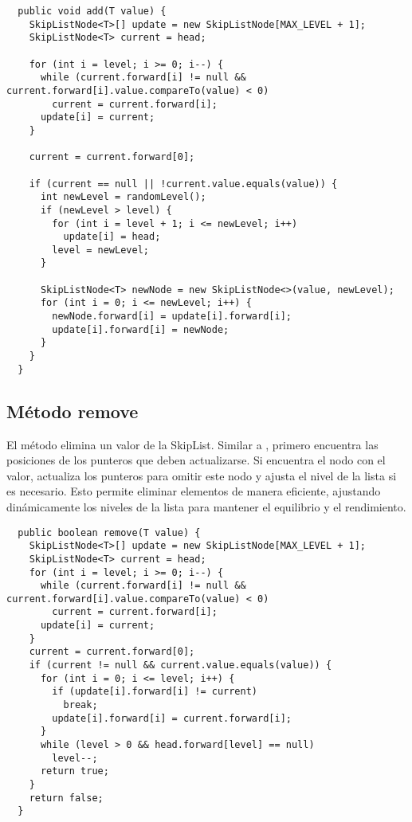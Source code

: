 \begin{verbatim}
  public void add(T value) {
    SkipListNode<T>[] update = new SkipListNode[MAX_LEVEL + 1];
    SkipListNode<T> current = head;

    for (int i = level; i >= 0; i--) {
      while (current.forward[i] != null && current.forward[i].value.compareTo(value) < 0)
        current = current.forward[i];
      update[i] = current;
    }

    current = current.forward[0];

    if (current == null || !current.value.equals(value)) {
      int newLevel = randomLevel();
      if (newLevel > level) {
        for (int i = level + 1; i <= newLevel; i++)
          update[i] = head;
        level = newLevel;
      }

      SkipListNode<T> newNode = new SkipListNode<>(value, newLevel);
      for (int i = 0; i <= newLevel; i++) {
        newNode.forward[i] = update[i].forward[i];
        update[i].forward[i] = newNode;
      }
    }
  }
\end{verbatim}

\subsection{Método remove}

El método  elimina un valor de la SkipList. Similar a , primero encuentra las posiciones de los punteros que deben actualizarse. Si encuentra el nodo con el valor, actualiza los punteros para omitir este nodo y ajusta el nivel de la lista si es necesario. Esto permite eliminar elementos de manera eficiente, ajustando dinámicamente los niveles de la lista para mantener el equilibrio y el rendimiento.

\begin{verbatim}
  public boolean remove(T value) {
    SkipListNode<T>[] update = new SkipListNode[MAX_LEVEL + 1];
    SkipListNode<T> current = head;
    for (int i = level; i >= 0; i--) {
      while (current.forward[i] != null && current.forward[i].value.compareTo(value) < 0)
        current = current.forward[i];
      update[i] = current;
    }
    current = current.forward[0];
    if (current != null && current.value.equals(value)) {
      for (int i = 0; i <= level; i++) {
        if (update[i].forward[i] != current)
          break;
        update[i].forward[i] = current.forward[i];
      }
      while (level > 0 && head.forward[level] == null)
        level--;
      return true;
    }
    return false;
  }
\end{verbatim}

